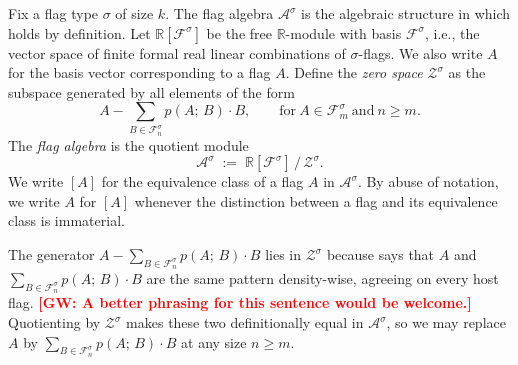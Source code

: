 \documentclass{article}
\newcommand{\den}[2]{p(#1;\,#2)}
\newcommand{\gw}[1]{\textcolor{red}{\textbf{[GW: #1]}}}
\begin{document}
Fix a flag type $\sigma$ of size $k$.
The flag algebra $\mathcal{A}^\sigma$ is the algebraic structure in which
 holds by definition.
Let
$\mathbb{R}[\mathcal{F}^\sigma]$ be the free $\mathbb{R}$-module with basis
$\mathcal{F}^\sigma$, i.e., the vector space of finite formal real linear
combinations of $\sigma$-flags.  We also write $A$ for the basis vector
corresponding to a flag $A$.
Define the \emph{zero space} $\mathcal{Z}^\sigma$ as the subspace generated
by all elements of the form
\[
  A - \sum_{B \in \mathcal{F}^\sigma_n} \den{A}{B} \cdot B,
  \qquad \text{for}\ A \in \mathcal{F}^\sigma_m \ \text{and}\ n \geq m.
\]
The \emph{flag algebra} is the quotient module
\[
  \mathcal{A}^\sigma \;:=\; \mathbb{R}[\mathcal{F}^\sigma] \,/\, \mathcal{Z}^\sigma.
\]
We write $[A]$ for the equivalence class of a flag $A$ in $\mathcal{A}^\sigma$.
By abuse of notation, we write $A$ for $[A]$ whenever the distinction between
a flag and its equivalence class is immaterial.

The generator $A - \sum_{B \in \mathcal{F}^\sigma_n} \den{A}{B} \cdot B$ lies
in $\mathcal{Z}^\sigma$ because  says that $A$ and
$\sum_{B \in \mathcal{F}^\sigma_n} \den{A}{B} \cdot B$ are the same pattern density-wise, agreeing on every
host flag. \gw{A better phrasing for this sentence would be welcome.}  Quotienting by $\mathcal{Z}^\sigma$ makes these two definitionally equal
in $\mathcal{A}^\sigma$, so we may replace $A$ by
$\sum_{B \in \mathcal{F}^\sigma_n} \den{A}{B} \cdot B$ at any size $n \geq m$.
\end{document}
